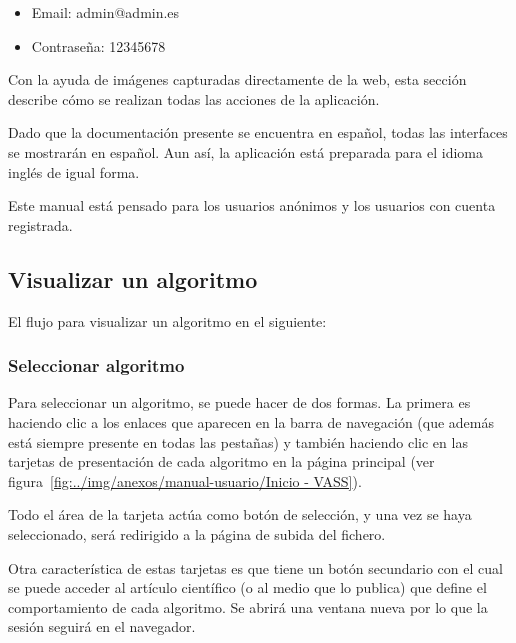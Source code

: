 \begin{tcolorbox}[colback=violet!5!white,colframe=violet!75!black,fontupper=\footnotesize,title=Credenciales administrador]
	\begin{itemize}
		\item Email: admin@admin.es
		\item Contraseña: 12345678
	\end{itemize}
\end{tcolorbox}

Con la ayuda de imágenes capturadas directamente de la web, esta sección
describe cómo se realizan todas las acciones de la aplicación.

Dado que la documentación presente se encuentra en español, todas las interfaces
se mostrarán en español. Aun así, la aplicación está preparada para el idioma
inglés de igual forma.

Este manual está pensado para los usuarios anónimos y los usuarios con cuenta
registrada.

\subsection{Visualizar un algoritmo}

El flujo para visualizar un algoritmo en el siguiente:


\subsubsection{Seleccionar algoritmo}
Para seleccionar un algoritmo, se puede hacer de dos formas. La primera es haciendo clic a los enlaces que aparecen en la barra de navegación (que además está siempre presente en todas las pestañas) y también haciendo clic en las tarjetas de presentación de cada algoritmo en la página principal (ver figura~\ref{fig:../img/anexos/manual-usuario/Inicio - VASS}).


Todo el área de la tarjeta actúa como botón de selección, y una vez se haya seleccionado, será redirigido a la página de subida del fichero. 

Otra característica de estas tarjetas es que tiene un botón secundario con el cual se puede acceder al artículo científico (o al medio que lo publica) que define el comportamiento de cada algoritmo. Se abrirá una ventana nueva por lo que la sesión seguirá en el navegador.

